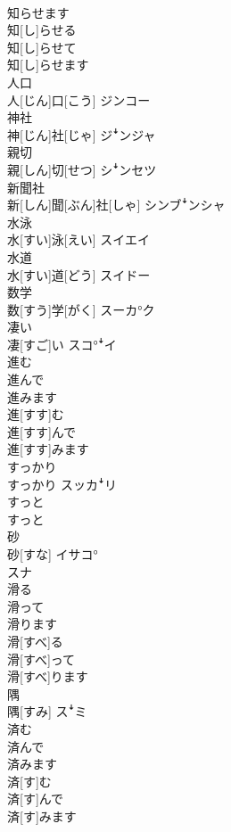\documentclass[8pt]{extreport}
\begin{document}
\begin{CJK}{UTF8}{min}
\\	知らせます	
\\	知[し]らせる 
\\	知[し]らせて 
\\	知[し]らせます	
\\	人口	
\\	人[じん]口[こう]	ジンコー
\\	神社	
\\	神[じん]社[じゃ]	ジꜜンジャ
\\	親切	
\\	親[しん]切[せつ]	シꜜンセツ
\\	新聞社	
\\	新[しん]聞[ぶん]社[しゃ]	シンブꜜンシャ
\\	水泳	
\\	水[すい]泳[えい]	スイエイ
\\	水道	
\\	水[すい]道[どう]	スイドー
\\	数学	
\\	数[すう]学[がく]	スーカ°ク
\\	凄い	
\\	凄[すご]い	スコ°ꜜイ
\\	進む 
\\	進んで 
\\	進みます	
\\	進[すす]む 
\\	進[すす]んで 
\\	進[すす]みます	
\\	すっかり	
\\	すっかり	スッカꜜリ
\\	すっと	
\\	すっと	
\\	砂	
\\	砂[すな]	イサコ° 
\\	スナ
\\	滑る 
\\	滑って 
\\	滑ります	
\\	滑[すべ]る 
\\	滑[すべ]って 
\\	滑[すべ]ります	
\\	隅	
\\	隅[すみ]	スꜜミ
\\	済む 
\\	済んで 
\\	済みます	
\\	済[す]む 
\\	済[す]んで 
\\	済[す]みます 

\end{CJK}
\end{document}
